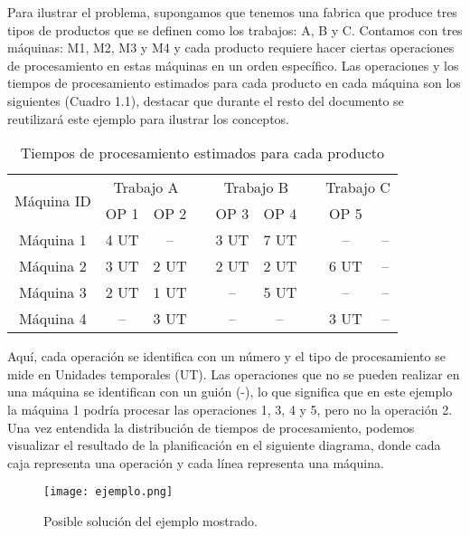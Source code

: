 Para ilustrar el problema, supongamos que tenemos una fabrica que produce tres tipos de productos
que se definen como los trabajos: A, B y C. Contamos con tres máquinas: M1, M2, M3 y M4 
y cada producto requiere hacer ciertas operaciones de procesamiento en estas máquinas en 
un orden específico. Las operaciones y los tiempos de procesamiento estimados para cada 
producto en cada máquina son los siguientes (Cuadro 1.1), destacar que durante el resto del documento
se reutilizará este ejemplo para ilustrar los conceptos. 

\begin{table}[ht]
    \caption{Tiempos de procesamiento estimados para cada producto} 
    \centering 
    \begin{tabular}{ccccccccc}  

    \toprule
    \multirow{2}{*}{\parbox[c]{.2\linewidth}{\centering Máquina ID}} & 
    \multicolumn{2}{c}{Trabajo A} && 
    \multicolumn{2}{c}{Trabajo B} && 
    \multicolumn{2}{c}{Trabajo C} \\ 

    \cmidrule{2-3} \cmidrule{5-6} \cmidrule{8-9}
     & {\centering OP 1} & {OP 2} && {OP 3} & {OP 4} && {OP 5}\\

    \midrule
    Máquina 1 & 4 UT & --   && 3 UT & 7 UT && --   & -- \\
    Máquina 2 & 3 UT & 2 UT && 2 UT & 2 UT && 6 UT & -- \\
    Máquina 3 & 2 UT & 1 UT && --   & 5 UT && --   & -- \\  
    Máquina 4 & --   & 3 UT && --   & --   && 3 UT & -- \\ 
    \bottomrule
    
    \end{tabular}
\end{table}

Aquí, cada operación se identifica con un número y el tipo de procesamiento se mide en Unidades temporales
(UT). Las operaciones que no se pueden realizar en una máquina se identifican con un guión (-), lo que 
significa que en este ejemplo la máquina 1 podría procesar las operaciones 1, 3, 4 y 5, pero 
no la operación 2. Una vez entendida la distribución de tiempos de procesamiento, podemos visualizar
el resultado de la planificación en el siguiente diagrama, donde cada caja representa una operación 
y cada línea representa una máquina.

\begin{figure}[ht]
    \centering
    \texttt{[image: ejemplo.png]}
    \caption{Posible solución del ejemplo mostrado.}
    \label{fig:example-solution}
\end{figure}

